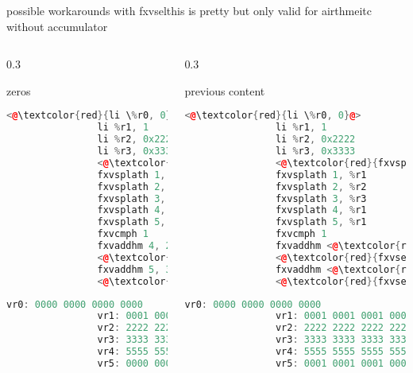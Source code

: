 \documentclass[10pt]{beamer}
\begin{document}
\begin{frame}[fragile]{possible workarounds with fxvsel}{this is pretty but only valid for airthmeitc without accumulator}
	\begin{columns}[t]
		\begin{column}{0.3\textwidth}
			\begin{block}{zeros}
			\begin{lstlisting}[language=C++,basicstyle=\ttfamily\scriptsize,keywordstyle=\color{red}]
				<@\textcolor{red}{li \%r0, 0}@>
				li %r1, 1
				li %r2, 0x2222
				li %r3, 0x3333
				<@\textcolor{red}{fxvsplath 0, \%r0}@>
				fxvsplath 1, %r1
				fxvsplath 2, %r2
				fxvsplath 3, %r3
				fxvsplath 4, %r1
				fxvsplath 5, %r1
				fxvcmph 1
				fxvaddhm 4, 2, 1, <@\textcolor{red}{0}@>
				<@\textcolor{red}{fxvsel 4, 4, 0, 1}@>
				fxvaddhm 5, 3, 3, <@\textcolor{red}{0}@>
				<@\textcolor{red}{fxvsel 5, 5, 0, 2}@>
			\end{lstlisting}
      		\begin{lstlisting}[language=C++,basicstyle=\fontsize{5}{7}\selectfont\ttfamily,keywordstyle=\color{red}]
				vr0: 0000 0000 0000 0000
				vr1: 0001 0001 0001 0001
				vr2: 2222 2222 2222 2222
				vr3: 3333 3333 3333 3333
				vr4: 5555 5555 5555 5555
				vr5: 0000 0000 0000 0000
			\end{lstlisting}
			\end{block}
    	\end{column}
    	\begin{column}{0.3\textwidth}
    		\begin{block}{previous content}
    		\begin{lstlisting}[language=C++,basicstyle=\ttfamily\scriptsize,keywordstyle=\color{red}]
				<@\textcolor{red}{li \%r0, 0}@>
				li %r1, 1
				li %r2, 0x2222
				li %r3, 0x3333
				<@\textcolor{red}{fxvsplath 0, \%r0}@>
				fxvsplath 1, %r1
				fxvsplath 2, %r2
				fxvsplath 3, %r3
				fxvsplath 4, %r1
				fxvsplath 5, %r1
				fxvcmph 1
				fxvaddhm <@\textcolor{red}{0}@>, 2, 1, <@\textcolor{red}{0}@>
				<@\textcolor{red}{fxvsel 4, 0, 4, 1}@>
				fxvaddhm <@\textcolor{red}{0}@>, 3, 3, <@\textcolor{red}{0}@>
				<@\textcolor{red}{fxvsel 5, 0, 5, 2}@>
	\end{lstlisting}
      			\begin{lstlisting}[language=C++,basicstyle=\fontsize{5}{7}\selectfont\ttfamily,keywordstyle=\color{red}]
				vr0: 0000 0000 0000 0000
				vr1: 0001 0001 0001 0001
				vr2: 2222 2222 2222 2222
				vr3: 3333 3333 3333 3333
				vr4: 5555 5555 5555 5555
				vr5: 0001 0001 0001 0001

\end{lstlisting}
\end{block}
\end{column}
\end{columns}
\end{frame}
\end{document}
